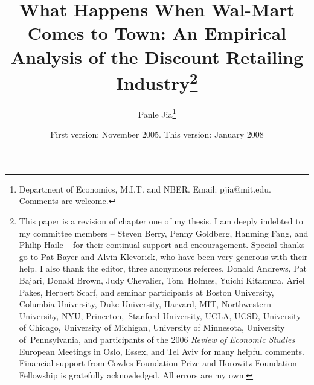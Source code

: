 \documentclass[notitlepage,onecolumn,11pt]{article}
\begin{document}
\title{What Happens When Wal-Mart Comes to Town: An Empirical Analysis of
the Discount Retailing Industry\thanks{%
This paper is a revision of chapter one of my thesis. I am deeply indebted
to my committee members -- Steven Berry, Penny Goldberg, Hanming Fang, and
Philip Haile -- for their continual support and encouragement. Special
thanks go to Pat Bayer and Alvin Klevorick, who have been very generous with
their help. I also thank the editor, three anonymous referees, Donald
Andrews, Pat Bajari, Donald Brown, Judy Chevalier, Tom\ Holmes, Yuichi
Kitamura, Ariel Pakes, Herbert Scarf, and seminar participants at Boston
University, Columbia University, Duke University, Harvard, MIT, Northwestern
University, NYU, Princeton,\ Stanford University, UCLA, UCSD, University of
Chicago, University of Michigan, University of Minnesota, University of\
Pennsylvania, and participants of the 2006 \textit{Review of Economic Studies%
} European Meetings in Oslo, Essex, and Tel Aviv for many helpful comments.
Financial support from Cowles Foundation Prize and Horowitz Foundation
Fellowship is gratefully acknowledged. All errors are my own.}}
\author{Panle Jia\thanks{%
Department of Economics, M.I.T. and NBER. Email: pjia@mit.edu. Comments are
welcome.}}
\date{First version: November 2005. This version: January 2008}
\maketitle
\end{document}

